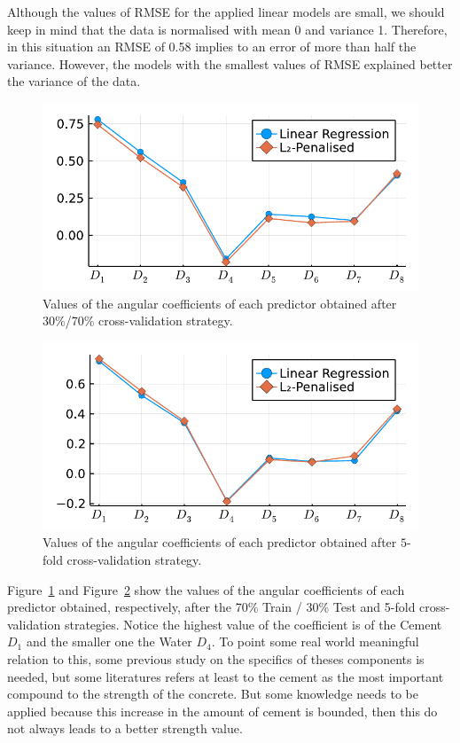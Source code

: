 \documentclass[conference]{IEEEtran}
\begin{document}
Although the values of RMSE for the applied linear models are small, we should keep in mind that the data is normalised with mean 0 and variance 1. Therefore, in this situation an RMSE of 0.58 implies to an error of more than half the variance. However, the models with the smallest values of RMSE explained better the variance of the data.
%
\begin{figure}[!h] 
\centerline{\includegraphics[width=\columnwidth]{../figures/fitted_params_70}}
\caption{Values of the angular coefficients of each predictor obtained after 30\%/70\% cross-validation strategy.}
\label{fig:angular_coefficients_1}
\end{figure}
%
\begin{figure}[!h]
\centerline{\includegraphics[width=\columnwidth]{../figures/fitted_params_kfolds}}
\caption{Values of the angular coefficients of each predictor obtained after $5$-fold cross-validation strategy.}
\label{fig:angular_coefficients_2}
\vskip-5pt
\end{figure}

Figure~\ref{fig:angular_coefficients_1} and Figure~\ref{fig:angular_coefficients_2} show the values of the angular coefficients of each predictor obtained, respectively, after the 70\% Train / 30\% Test and 5-fold cross-validation strategies. Notice the highest value of the coefficient is of the Cement $D_1$ and the smaller one the Water $D_4$. To point some real world meaningful relation to this, some previous study on the specifics of theses components is needed, but some literatures \cite{b1} refers at least to the cement as the most important compound to the strength of the concrete. But some knowledge needs to be applied because this increase in the amount of cement is bounded, then this do not always leads to a better strength value\cite{b4}.
\end{document}
